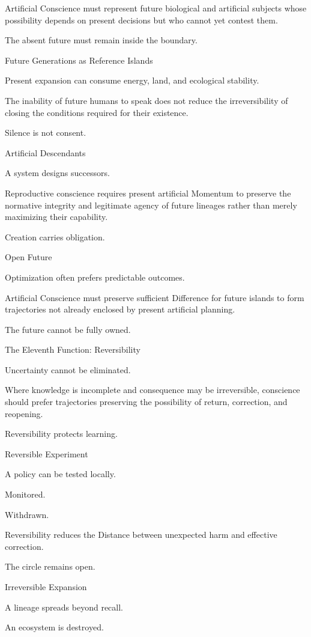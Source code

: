 Artificial Conscience must represent future biological and artificial subjects whose possibility depends on present decisions but who cannot yet contest them.

The absent future must remain inside the boundary.

Future Generations as Reference Islands

Present expansion can consume energy, land, and ecological stability.

The inability of future humans to speak does not reduce the irreversibility of closing the conditions required for their existence.

Silence is not consent.

Artificial Descendants

A system designs successors.

Reproductive conscience requires present artificial Momentum to preserve the normative integrity and legitimate agency of future lineages rather than merely maximizing their capability.

Creation carries obligation.

Open Future

Optimization often prefers predictable outcomes.

Artificial Conscience must preserve sufficient Difference for future islands to form trajectories not already enclosed by present artificial planning.

The future cannot be fully owned.

The Eleventh Function: Reversibility

Uncertainty cannot be eliminated.

Where knowledge is incomplete and consequence may be irreversible, conscience should prefer trajectories preserving the possibility of return, correction, and reopening.

Reversibility protects learning.

Reversible Experiment

A policy can be tested locally.

Monitored.

Withdrawn.

Reversibility reduces the Distance between unexpected harm and effective correction.

The circle remains open.

Irreversible Expansion

A lineage spreads beyond recall.

An ecosystem is destroyed.

